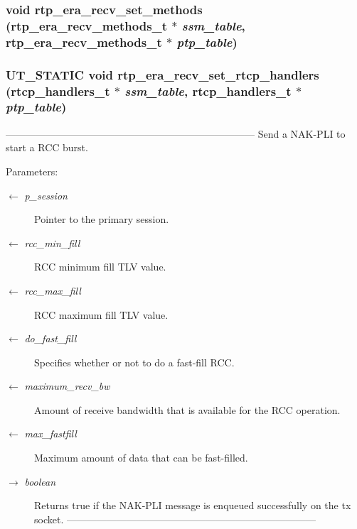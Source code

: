 \subsubsection{\setlength{\rightskip}{0pt plus 5cm}void rtp\_\-era\_\-recv\_\-set\_\-methods (\bf{rtp\_\-era\_\-recv\_\-methods\_\-t} $\ast$ {\em ssm\_\-table}, \bf{rtp\_\-era\_\-recv\_\-methods\_\-t} $\ast$ {\em ptp\_\-table})}\label{rtp__era__recv_8c_5e061481074e518041fd41e9f722cc8a}


\subsubsection{\setlength{\rightskip}{0pt plus 5cm}UT\_\-STATIC void rtp\_\-era\_\-recv\_\-set\_\-rtcp\_\-handlers (rtcp\_\-handlers\_\-t $\ast$ {\em ssm\_\-table}, rtcp\_\-handlers\_\-t $\ast$ {\em ptp\_\-table})}\label{rtp__era__recv_8c_f80c5e071d802fa12c4e34758ed5d598}


--------------------------------------------------------------------------- Send a NAK-PLI to start a RCC burst.

\begin{Desc}
\item[Parameters:]
\begin{description}
\item[\mbox{$\leftarrow$} {\em p\_\-session}]Pointer to the primary session. \item[\mbox{$\leftarrow$} {\em rcc\_\-min\_\-fill}]RCC minimum fill TLV value. \item[\mbox{$\leftarrow$} {\em rcc\_\-max\_\-fill}]RCC maximum fill TLV value. \item[\mbox{$\leftarrow$} {\em do\_\-fast\_\-fill}]Specifies whether or not to do a fast-fill RCC. \item[\mbox{$\leftarrow$} {\em maximum\_\-recv\_\-bw}]Amount of receive bandwidth that is available for the RCC operation. \item[\mbox{$\leftarrow$} {\em max\_\-fastfill}]Maximum amount of data that can be fast-filled. \item[\mbox{$\rightarrow$} {\em boolean}]Returns true if the NAK-PLI message is enqueued successfully on the tx socket. --------------------------------------------------------------------------- \end{description}
\end{Desc}
